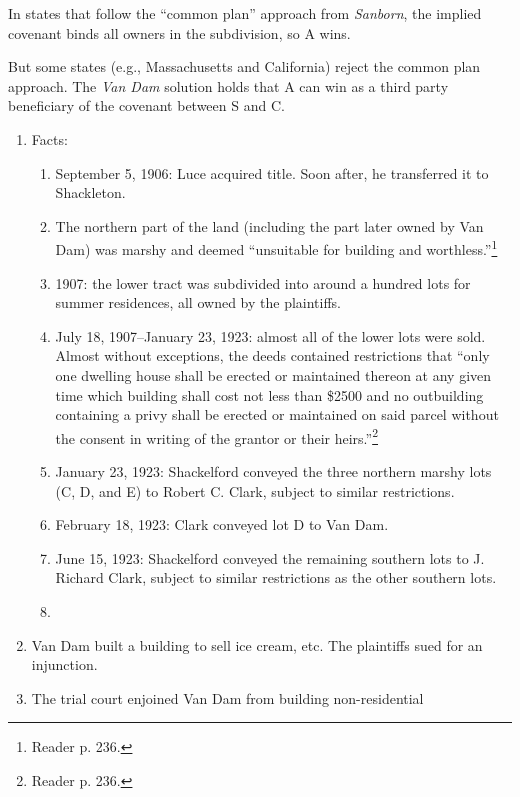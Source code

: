 In states that follow the ``common plan'' approach from \emph{Sanborn}, the 
implied covenant binds all owners in the subdivision, so A wins.

But some states (e.g., Massachusetts and California) reject the common plan 
approach. The \emph{Van Dam} solution holds that A can win as a third party 
beneficiary of the covenant between S and C.

\begin{enumerate}
    \item Facts:
    \begin{enumerate}
        \item September 5, 1906: Luce acquired title. Soon after, he 
        transferred it to Shackleton.
        \item The northern part of the land (including the part later owned by 
        Van Dam) was marshy and deemed ``unsuitable for building and 
        worthless.''\footnote{Reader p. 236.}
        \item 1907: the lower tract was subdivided into around a hundred lots 
        for summer residences, all owned by the plaintiffs.
        \item July 18, 1907--January 23, 1923: almost all of the lower lots 
        were sold. Almost without exceptions, the deeds contained restrictions 
        that ``only one dwelling house shall be erected or maintained thereon 
        at any given time which building shall cost not less than \$2500 and 
        no outbuilding containing a privy shall be erected or maintained on 
        said parcel without the consent in writing of the grantor or their 
        heirs.''\footnote{Reader p. 236.}
        \item January 23, 1923: Shackelford conveyed the three northern marshy 
        lots (C, D, and E) to Robert C. Clark, subject to similar 
        restrictions.
        \item February 18, 1923: Clark conveyed lot D to Van Dam. 
        \item June 15, 1923: Shackelford conveyed the remaining southern lots 
        to J. Richard Clark, subject to similar restrictions as the other 
        southern lots.
        \item 
    \end{enumerate}
    \item Van Dam built a building to sell ice cream, etc. The plaintiffs sued 
    for an injunction.
    \item The trial court enjoined Van Dam from building non-residential 

\end{enumerate}
